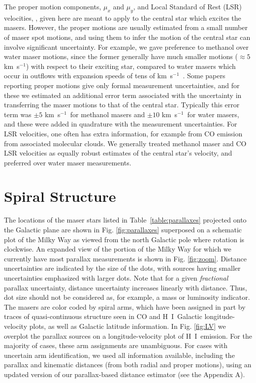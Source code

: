 \documentclass[12pt,preprint]{aastex}
\def\kms  {km~s$^{-1}$}
\def\HI   {H~{\small I}}
\def\eg   {e.g.,~}
\def\vlsr  {\ifmmode {v_{\rm LSR}}\else {$v_{\rm LSR}$}\fi}
\begin{document}
The proper motion components, $\mu_x$ and $\mu_y$, and Local Standard of Rest (LSR) 
velocities, \vlsr, given here are meant to apply to the central star which 
excites the masers.  However, the proper motions are usually estimated from
a small number of maser spot motions, and using them to infer the motion of
the central star can involve significant uncertainty.  For example, we gave preference 
to methanol over water maser motions, since the former generally have much smaller 
motions ($\approx5$ \kms) with respect to their exciting star, compared to 
water masers which occur in outflows with expansion speeds of tens of \kms\ 
\citep[\eg][]{Sanna:10a,Sanna:10b,Moscadelli:11b}.   Some papers reporting 
proper motions give only formal measurement uncertainties, and for these we 
estimated an additional error term associated with the uncertainty in 
transferring the maser motions to that of the central star. Typically this error 
term was $\pm5$ \kms\ for methanol masers and $\pm10$ \kms\ for water masers, and
these were added in quadrature with the measurement uncertainties.  For LSR 
velocities, one often has extra information, for example from CO emission from 
associated molecular clouds.  We generally treated methanol maser and CO LSR 
velocities as equally robust estimates of the central star's velocity, and 
preferred over water maser measurements.


\section{Spiral Structure} \label{sect:spiral_structure}

The locations of the maser stars listed in Table~\ref{table:parallaxes} 
projected onto the Galactic plane are shown in Fig. \ref{fig:parallaxes} 
superposed on a schematic plot of the Milky Way as viewed from the north 
Galactic pole where rotation is clockwise.  An expanded view of the portion
of the Milky Way for which we currently have most parallax measurements is shown
in Fig. \ref{fig:zoom}.  Distance uncertainties are indicated by the size 
of the dots, with sources having smaller uncertainties emphasized with 
larger dots.  Note that for a given {\it fractional} parallax uncertainty, 
distance uncertainty increases linearly with distance.  Thus, dot size should 
not be considered as, for example, a mass or luminosity indicator. The masers are 
color coded by spiral arms, which have been assigned in part by traces 
of quasi-continuous structure seen in CO and \HI\ Galactic 
longitude-velocity plots, as well as Galactic latitude information.
In Fig. \ref{fig:LV} we overplot the parallax sources on a longitude-velocity
plot of \HI\ emission.
For the majority of cases, these arm assignments are unambiguous.  
For cases with uncertain arm identification, we used all information available, 
including the parallax and kinematic distances (from both radial and proper motions), 
using an updated version of our parallax-based distance estimator (see the Appendix A).
\end{document}
